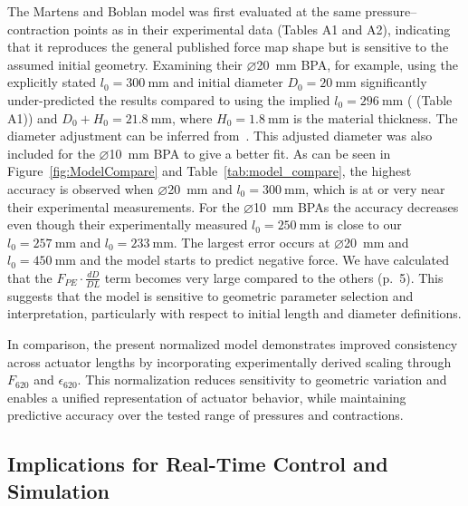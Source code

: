The Martens and Boblan model was first evaluated at the same pressure–contraction points as in their experimental data \citep{martens_modeling_2017} (Tables A1 and  A2), indicating that it reproduces the general published force map shape but is sensitive to the assumed initial geometry. Examining their $\diameter$\qty{20}{\mm} BPA, for example, using the explicitly stated $l_0=\qty{300}{\mm}$ and initial diameter $D_{0}=\qty{20}{\mm}$ significantly under-predicted the results compared to using the implied $l_0=\qty{296}{\mm}$ (\citep{martens_modeling_2017} (Table A1)) and $D_{0}+H_{0}=\qty{21.8}{\mm}$, where $H_{0}=\qty{1.8}{\mm}$ is the material thickness. The diameter adjustment can be inferred \mbox{from \citep{chou_measurement_1996}.} This adjusted diameter was also included for the $\diameter$\qty{10}{\mm} BPA to give a better fit. As can be seen in Figure~\ref{fig:ModelCompare} and Table~\ref{tab:model_compare}, the highest accuracy is observed when $\diameter$\qty{20}{\mm} and $l_0=\qty{300}{\mm}$, which is at or very near their experimental measurements. For the $\diameter$\qty{10}{\mm} BPAs the accuracy decreases even though their experimentally measured $l_0=\qty{250}{\mm}$ is close to our $l_0=\qty{257}{\mm}$ and $l_0=\qty{233}{\mm}$. The largest error occurs at $\diameter$\qty{20}{\mm} and $l_0=\qty{450}{\mm}$ and the model starts to predict negative force. We have calculated that the $F_{PE}\cdot\frac{dD}{DL}$ term becomes very large compared to the others \citep{martens_modeling_2017} (p.~5). This suggests that the model is sensitive to geometric parameter selection and interpretation, particularly with respect to initial length and diameter definitions.

In comparison, the present normalized model demonstrates improved consistency across actuator lengths by incorporating experimentally derived scaling through $F_{620}$ and $\epsilon_{620}$. This normalization reduces sensitivity to geometric variation and enables a unified representation of actuator behavior, while maintaining predictive accuracy over the tested range of pressures and contractions.

\subsection{Implications for Real-Time Control and Simulation}

